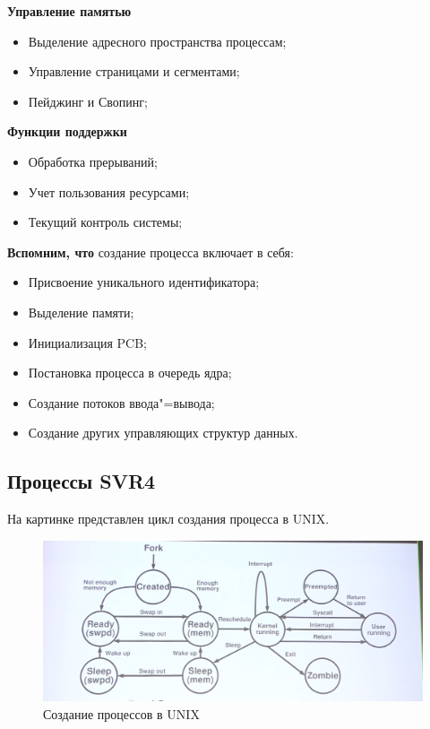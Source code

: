 \documentclass[bachelor, och, book]{SCWorks}
\theoremstyle{remark}
\begin{document}
    \hfill \break
    \textbf{Управление памятью}
    \begin{itemize}[label=$\bullet$]
        \item Выделение адресного пространства процессам;
        \item Управление страницами и сегментами;
        \item Пейджинг и Свопинг;
    \end{itemize}

    \hfill \break
    \textbf{Функции поддержки}
    \begin{itemize}[label=$\bullet$]
        \item Обработка прерываний;
        \item Учет пользования ресурсами;
        \item Текущий контроль системы;
    \end{itemize}


    \hfill \break
    \textbf{Вспомним, что} создание процесса включает в себя:

    \begin{itemize}[label=$\bullet$]
        \item Присвоение уникального идентификатора;
        \item Выделение памяти;
        \item Инициализация PCB;
        \item Постановка процесса в очередь ядра;
        \item Создание потоков ввода"=вывода;
        \item Создание других управляющих структур данных.
    \end{itemize}

    \subsection{Процессы SVR4}

    На картинке представлен цикл создания процесса в UNIX. 

    \begin{figure}[H]
        \begin{center}
            \includegraphics[scale=0.45]{res/SVR4.png}
            \caption{Создание процессов в UNIX}
        \end{center}
    \end{figure}
\end{document}
